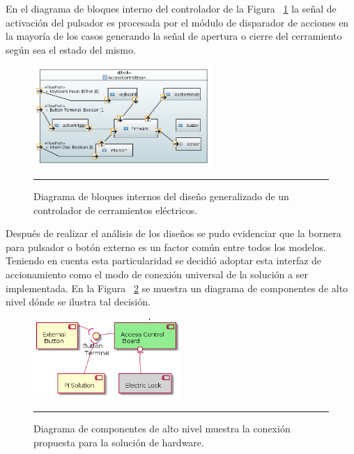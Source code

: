 En el diagrama de bloques interno del controlador de la Figura ~\ref{fig:ibd_controladora} la señal de activación del pulsador es procesada por el módulo de disparador de acciones en la mayoría de los casos generando la señal de apertura o cierre del cerramiento según sea el estado del mismo.\\
\begin{figure}[htbp]
	\centering
	\includegraphics[width=0.6\textwidth]{Pictures/IBD_controladora.png}
	\rule{35em}{1pt}
	\caption[Diagrama Bloques Internos Controlador]{Diagrama de bloques internos del diseño generalizado de un controlador de cerramientos eléctricos.}
	\label{fig:ibd_controladora}
\end{figure}
Después de realizar el análisis de los diseños se pudo evidenciar que la bornera para pulsador o botón externo es un factor común entre todos los modelos. Teniendo en cuenta esta particularidad se decidió adoptar esta interfaz de accionamiento como el modo de conexión universal de la solución a ser implementada. En la Figura ~\ref{fig:componentes_controladora+sol} se muestra un diagrama de componentes de alto nivel dónde se ilustra tal decisión.
\begin{figure}[htbp]
	\centering
	\includegraphics[width=0.5\textwidth]{Pictures/componentes_controladora+sol.png}
	\rule{35em}{1pt}
	\caption[Diagrama de Componentes Conexión al Controlador]{Diagrama de componentes de alto nivel muestra la conexión propuesta para la solución de hardware.}
	\label{fig:componentes_controladora+sol}
\end{figure}
